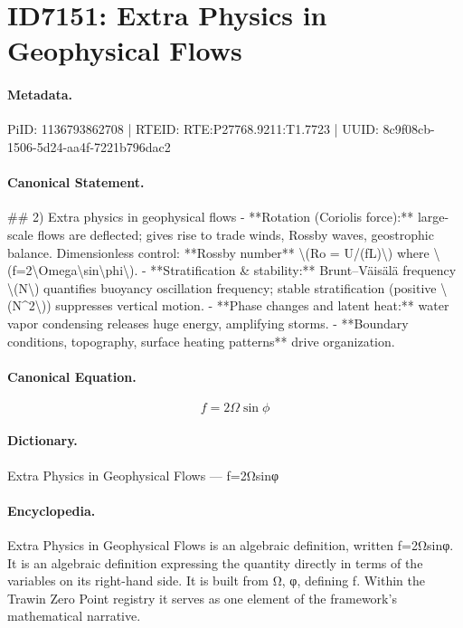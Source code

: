 \section*{ID7151: Extra Physics in Geophysical Flows}
\paragraph{Metadata.}
PiID: 1136793862708 | RTEID: RTE:P27768.9211:T1.7723 | UUID: 8c9f08cb-1506-5d24-aa4f-7221b796dac2

\paragraph{Canonical Statement.}
\#\# 2) Extra physics in geophysical flows - **Rotation (Coriolis force):** large-scale flows are deflected; gives rise to trade winds, Rossby waves, geostrophic balance. Dimensionless control: **Rossby number** \textbackslash{}(Ro = U/(fL)\textbackslash{}) where \textbackslash{}(f=2\textbackslash{}Omega\textbackslash{}sin\textbackslash{}phi\textbackslash{}). - **Stratification \& stability:** Brunt–Väisälä frequency \textbackslash{}(N\textbackslash{}) quantifies buoyancy oscillation frequency; stable stratification (positive \textbackslash{}(N\textasciicircum{}2\textbackslash{})) suppresses vertical motion. - **Phase changes and latent heat:** water vapor condensing releases huge energy, amplifying storms. - **Boundary conditions, topography, surface heating patterns** drive organization.

\paragraph{Canonical Equation.}
\[
f=2\Omega\sin\phi
\]

\paragraph{Dictionary.}
Extra Physics in Geophysical Flows — f=2Ωsinφ

\paragraph{Encyclopedia.}
Extra Physics in Geophysical Flows is an algebraic definition, written f=2Ωsinφ. It is an algebraic definition expressing the quantity directly in terms of the variables on its right-hand side. It is built from Ω, φ, defining f. Within the Trawin Zero Point registry it serves as one element of the framework's mathematical narrative.
